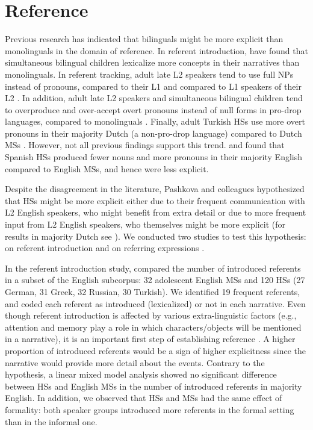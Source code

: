 \documentclass[output=paper,colorlinks,citecolor=brown]{langscibook}
\begin{document}
\section{Reference} \label{sec:pashkovaetal:Reference}

Previous research has indicated that bilinguals might be more explicit than monolinguals in the domain of reference. In referent introduction, \citet{Barbosa2017} have found that simultaneous bilingual children lexicalize more concepts in their narratives than monolinguals. In referent tracking, adult late L2 speakers tend to use full NPs instead of pronouns, compared to their L1 \parencite{Hendriks2003, Gullberg2006} and compared to L1 speakers of their L2 \parencite{Hendriks2003, Yoshioka2008}. In addition, adult late L2 speakers and simultaneous bilingual children tend to overproduce and over-accept overt pronouns instead of null forms in pro-drop languages, compared to monolinguals \parencite{Serratrice2004, Sorace2006, Sorace2009a}. Finally, adult Turkish HSs use more overt pronouns in their majority Dutch (a non-pro-drop language) compared to Dutch MSs \parencite{azar2020reference}. However, not all previous findings support this trend. \citet{Contemori2023} and \citet{Contemori2021a} found that Spanish HSs produced fewer nouns and more pronouns in their majority English compared to English MSs, and hence were less explicit.

Despite the disagreement in the literature, Pashkova and colleagues hypothesized that HSs might be more explicit either due to their frequent communication with L2 English speakers, who might benefit from extra detail \parencite[144]{Polinsky2018book} or due to more frequent input from L2 English speakers, who themselves might be more explicit (for results in majority Dutch see \cite{azar2020reference}). We conducted two studies to test this hypothesis: on referent introduction \parencite{pashkova2020bucld} and on referring expressions \parencite{pashkovainprep_a}.

In the referent introduction study, \citet{pashkova2020bucld} compared the number of introduced referents in a subset of the English subcorpus: 32 adolescent English MSs and 120 HSs (27 German, 31 Greek, 32 Russian, 30 Turkish). We identified 19 frequent referents, and coded each referent as introduced (lexicalized) or not in each narrative. Even though referent introduction is affected by various extra-linguistic factors (e.g., attention and memory play a role in which characters/objects will be mentioned in a narrative), it is an important first step of establishing reference \parencite[1]{Vogels2019}. A higher proportion of introduced referents would be a sign of higher explicitness since the narrative would provide more detail about the events. Contrary to the hypothesis, a linear mixed model analysis showed no significant difference between HSs and English MSs in the number of introduced referents in majority English. In addition, we observed that HSs and MSs had the same effect of formality: both speaker groups introduced more referents in the formal setting than in the informal one.
\end{document}
